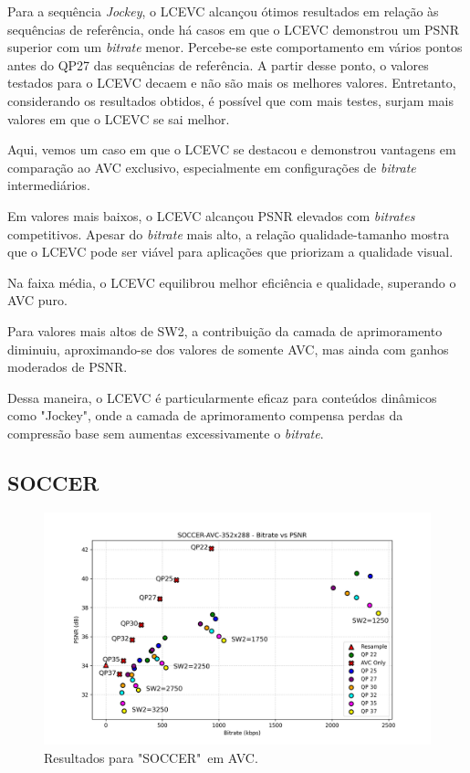 Para a sequência \textit{Jockey}, o \acrshort{LCEVC} alcançou ótimos resultados
em relação às sequências de referência, onde há casos em que o \acrshort{LCEVC}
demonstrou um \acrshort{PSNR} superior com um \textit{bitrate} menor. Percebe-se
este comportamento em vários pontos antes do QP27 das sequências de referência.
A partir desse ponto, o valores testados para o \acrshort{LCEVC} decaem e não
são mais os melhores valores. Entretanto, considerando os resultados obtidos,
é possível que com mais testes, surjam mais valores em que o \acrshort{LCEVC}
se sai melhor.

Aqui, vemos um caso em que o \acrshort{LCEVC} se destacou e demonstrou vantagens
em comparação ao \acrshort{AVC} exclusivo, especialmente em configurações de 
\textit{bitrate} intermediários.

Em valores mais baixos, o \acrshort{LCEVC} alcançou \acrshort{PSNR} elevados
com \textit{bitrates} competitivos. Apesar do \textit{bitrate} mais alto,
a relação qualidade-tamanho mostra que o \acrshort{LCEVC} pode ser viável
para aplicações que priorizam a qualidade visual.

Na faixa média, o \acrshort{LCEVC} equilibrou melhor eficiência e qualidade,
superando o \acrshort{AVC} puro. 

Para valores mais altos de SW2, a contribuição da camada de aprimoramento
diminuiu, aproximando-se dos valores de somente \acrshort{AVC}, mas ainda
com ganhos moderados de \acrshort{PSNR}.

Dessa maneira, o \acrshort{LCEVC} é particularmente eficaz para conteúdos
dinâmicos como "Jockey", onde a camada de aprimoramento compensa perdas da
compressão base sem aumentas excessivamente o \textit{bitrate}.

\subsection{SOCCER}

\begin{figure}[h]
    \centering
    \includegraphics[width=1.0\textwidth]{img/SOCCER-AVC.png}
    \caption{Resultados para "SOCCER"\ em \acrshort{AVC}. \cite{xiph}}
    \label{fig:SOCCER}
\end{figure}

